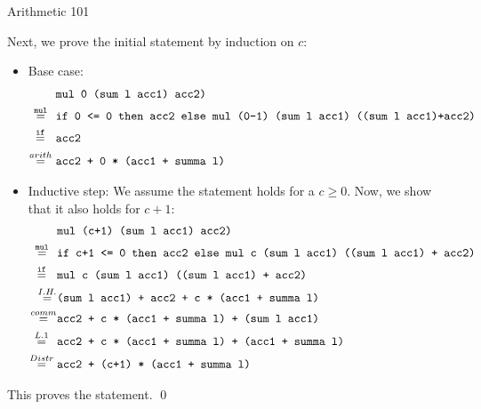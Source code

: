 \documentclass[
  english
]{tumteaching}
\newcommand{\qsmio}[1]{\text{\texttt{#1}}}
\begin{document}
\begin{assignment}[L]{Arithmetic 101}
\begin{solution}
    \vspace*{3mm}
    \noindent Next, we prove the initial statement by induction on $c$:
    \begin{itemize}
      \item Base case: 
      \begin{align*}
        &\;\qsmio{mul 0 (sum l acc1) acc2)}\\
        \overset{\qsmio{mul}}{=}\hspace*{1.5mm}&\;\qsmio{if 0 <= 0 then acc2 else mul (0-1) (sum l acc1) ((sum l acc1)+acc2)}\\
        \overset{\qsmio{if}}{=}\hspace*{2.2mm}&\;\qsmio{acc2}\\
        \overset{arith}{=}\hspace*{0.2mm}&\;\qsmio{acc2 + 0 * (acc1 + summa l)}\\
      \end{align*}

      \item Inductive step: We assume the statement holds for a $c \geq 0$. Now, we show that it also holds for $c+1$:
      \begin{align*}
        &\;\qsmio{mul (c+1) (sum l acc1) acc2)}\\
        \overset{\qsmio{mul}}{=}\hspace*{1.5mm}&\;\qsmio{if c+1 <= 0 then acc2 else mul c (sum l acc1) ((sum l acc1) + acc2)}\\
        \overset{\qsmio{if}}{=}\hspace*{2.2mm}&\;\qsmio{mul c (sum l acc1) ((sum l acc1) + acc2)}\\
        \overset{I.H.}{=}\hspace*{-.8mm}&\;\qsmio{(sum l acc1) + acc2 + c * (acc1 + summa l)}\\
        \overset{comm}{=}\hspace*{-.8mm}&\;\qsmio{acc2 + c * (acc1 + summa l) + (sum l acc1)}\\
        \overset{L.1}{=}\hspace*{1.5mm}&\;\qsmio{acc2 + c * (acc1 + summa l) + (acc1 + summa l)}\\
        \overset{Distr}{=}&\;\qsmio{acc2 + (c+1) * (acc1 + summa l)}\\
      \end{align*}
    \end{itemize}
    \noindent This proves the statement. \hfill \qed
  \end{solution}
\end{assignment}
\end{document}
